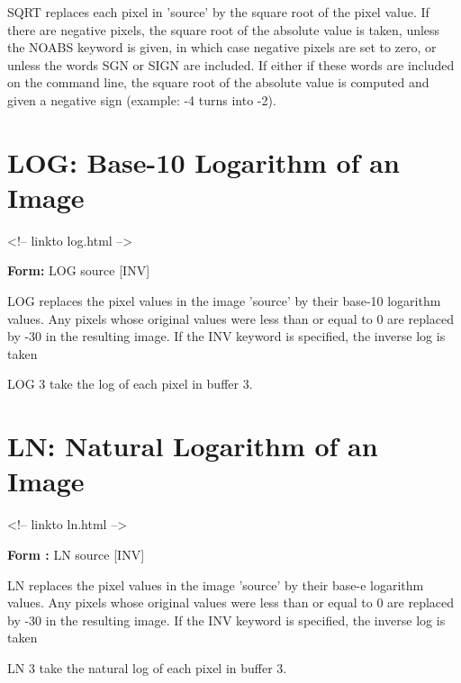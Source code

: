 SQRT replaces each pixel in 'source' by the square root of the pixel value.
If there are negative pixels, the square root of the absolute value is
taken, unless the NOABS keyword is given, in which case negative pixels are
set to zero, or unless the words SGN or SIGN are included.  If either if
these words are included on the command line, the square root of the
absolute value is computed and given a negative sign (example: -4 turns
into -2).

\section{LOG: Base-10 Logarithm of an Image}
\begin{rawhtml}
<!-- linkto log.html -->
\end{rawhtml}
\begin{command}
  \item[\textbf{Form:} LOG source {[INV]}\hfill]{}
\end{command}

LOG replaces the pixel values in the image 'source' by their base-10
logarithm values. Any pixels whose original values were less than or equal
to 0 are replaced by -30 in the resulting image.  If the INV keyword is
specified, the inverse log is taken

\begin{example}
  \item[LOG 3\hfill]{take the log of each pixel in buffer 3.}
\end{example}

\section{LN: Natural Logarithm of an Image}
\begin{rawhtml}
<!-- linkto ln.html -->
\end{rawhtml}
\begin{command}
  \item[\textbf{Form :} LN source {[INV]}\hfill]{}
\end{command}

LN replaces the pixel values in the image 'source' by their base-e
logarithm values. Any pixels whose original values were less than or equal
to 0 are replaced by -30 in the resulting image.  If the INV keyword is
specified, the inverse log is taken

\begin{example}
  \item[LN 3\hfill]{take the natural log of each pixel in buffer 3.}
\end{example}

